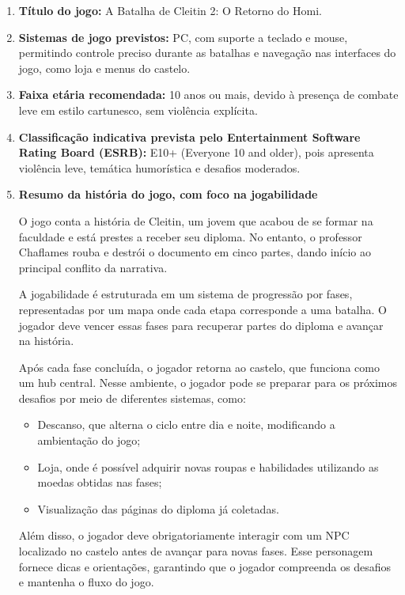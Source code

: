 \documentclass[12pt,a4paper]{article}
\begin{document}
\begin{enumerate}

\item \textbf{Título do jogo:}  
A Batalha de Cleitin 2: O Retorno do Homi.

\item \textbf{Sistemas de jogo previstos:}  
PC, com suporte a teclado e mouse, permitindo controle preciso durante as batalhas e navegação nas interfaces do jogo, como loja e menus do castelo.

\item \textbf{Faixa etária recomendada:}  
10 anos ou mais, devido à presença de combate leve em estilo cartunesco, sem violência explícita.

\item \textbf{Classificação indicativa prevista pelo Entertainment Software Rating Board (ESRB):}  
E10+ (Everyone 10 and older), pois apresenta violência leve, temática humorística e desafios moderados.

\item \textbf{Resumo da história do jogo, com foco na jogabilidade}

O jogo conta a história de Cleitin, um jovem que acabou de se formar na faculdade e está prestes a receber seu diploma. No entanto, o professor Chaflames rouba e destrói o documento em cinco partes, dando início ao principal conflito da narrativa.

A jogabilidade é estruturada em um sistema de progressão por fases, representadas por um mapa onde cada etapa corresponde a uma batalha. O jogador deve vencer essas fases para recuperar partes do diploma e avançar na história.

Após cada fase concluída, o jogador retorna ao castelo, que funciona como um hub central. Nesse ambiente, o jogador pode se preparar para os próximos desafios por meio de diferentes sistemas, como:
\begin{itemize}
\item Descanso, que alterna o ciclo entre dia e noite, modificando a ambientação do jogo;
\item Loja, onde é possível adquirir novas roupas e habilidades utilizando as moedas obtidas nas fases;
\item Visualização das páginas do diploma já coletadas.
\end{itemize}

Além disso, o jogador deve obrigatoriamente interagir com um NPC localizado no castelo antes de avançar para novas fases. Esse personagem fornece dicas e orientações, garantindo que o jogador compreenda os desafios e mantenha o fluxo do jogo.


\end{enumerate}
\end{document}
